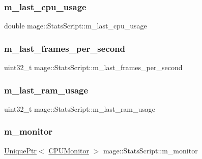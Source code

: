 \subsubsection{\texorpdfstring{m\+\_\+last\+\_\+cpu\+\_\+usage}{m\_last\_cpu\_usage}}
{\footnotesize\ttfamily double mage\+::\+Stats\+Script\+::m\+\_\+last\+\_\+cpu\+\_\+usage\hspace{0.3cm}{\ttfamily [private]}}

\hypertarget{classmage_1_1_stats_script_afcbbf37839891d06b1331af3cc7f6e82}{}\label{classmage_1_1_stats_script_afcbbf37839891d06b1331af3cc7f6e82} 
\subsubsection{\texorpdfstring{m\+\_\+last\+\_\+frames\+\_\+per\+\_\+second}{m\_last\_frames\_per\_second}}
{\footnotesize\ttfamily uint32\+\_\+t mage\+::\+Stats\+Script\+::m\+\_\+last\+\_\+frames\+\_\+per\+\_\+second\hspace{0.3cm}{\ttfamily [private]}}

\hypertarget{classmage_1_1_stats_script_a92335c973382a332cf5ce328454fd07b}{}\label{classmage_1_1_stats_script_a92335c973382a332cf5ce328454fd07b} 
\subsubsection{\texorpdfstring{m\+\_\+last\+\_\+ram\+\_\+usage}{m\_last\_ram\_usage}}
{\footnotesize\ttfamily uint32\+\_\+t mage\+::\+Stats\+Script\+::m\+\_\+last\+\_\+ram\+\_\+usage\hspace{0.3cm}{\ttfamily [private]}}

\hypertarget{classmage_1_1_stats_script_a12e321d8fe1003de3643c4b799dd4c8f}{}\label{classmage_1_1_stats_script_a12e321d8fe1003de3643c4b799dd4c8f} 
\subsubsection{\texorpdfstring{m\+\_\+monitor}{m\_monitor}}
{\footnotesize\ttfamily \hyperlink{namespacemage_a8c307fbcc33bce9b7f2aa4c26c3b95cf}{Unique\+Ptr}$<$ \hyperlink{classmage_1_1_c_p_u_monitor}{C\+P\+U\+Monitor} $>$ mage\+::\+Stats\+Script\+::m\+\_\+monitor\hspace{0.3cm}{\ttfamily [private]}}

